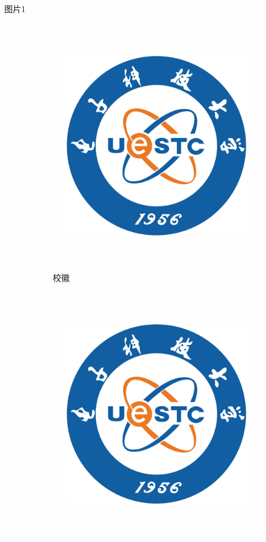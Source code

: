 \documentclass[aspectratio=169]{beamer}
\begin{document}
\begin{frame}{图片1}
\begin{figure}
\begin{subfigure}{0.3\textwidth}
            \includegraphics[width=\textwidth]{logo.pdf}
            \caption{校徽}
            \label{fig:subfig2}
        \end{subfigure}
        \begin{subfigure}{0.3\textwidth}
            \centering
            \includegraphics[width=\textwidth]{logo.pdf}

\end{subfigure}
\end{figure}
\end{frame}
\end{document}
